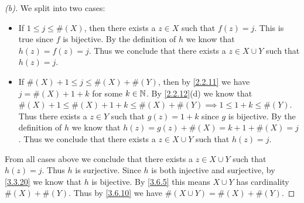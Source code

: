 \begin{proof}[(b)]
	We split into two cases:
	\begin{itemize}
		\item If \(1 \leq j \leq \#(X)\), then there exists a \(z \in X\) such that \(f(z) = j\).
		      This is true since \(f\) is bijective.
		      By the definition of \(h\) we know that \(h(z) = f(z) = j\).
		      Thus we conclude that there exists a \(z \in X \cup Y\) such that \(h(z) = j\).
		\item If \(\#(X) + 1 \leq j \leq \#(X) + \#(Y)\), then by \cref{2.2.11} we have \(j = \#(X) + 1 + k\) for some \(k \in \mathbb{N}\).
		      By \cref{2.2.12}(d) we know that \(\#(X) + 1 \leq \#(X) + 1 + k \leq \#(X) + \#(Y) \implies 1 \leq 1 + k \leq \#(Y)\).
		      Thus there exists a \(z \in Y\) such that \(g(z) = 1 + k\) since \(g\) is bijective.
		      By the definition of \(h\) we know that \(h(z) = g(z) + \#(X) = k + 1 + \#(X) = j\).
		      Thus we conclude that there exists a \(z \in X \cup Y\) such that \(h(z) = j\).
	\end{itemize}
	From all cases above we conclude that there exists a \(z \in X \cup Y\) such that \(h(z) = j\).
	Thus \(h\) is surjective.
	Since \(h\) is both injective and surjective, by \cref{3.3.20} we know that \(h\) is bijective.
	By \cref{3.6.5} this means \(X \cup Y\) has cardinality \(\#(X) + \#(Y)\).
	Thus by \cref{3.6.10} we have \(\#(X \cup Y) = \#(X) + \#(Y)\).
\end{proof}

